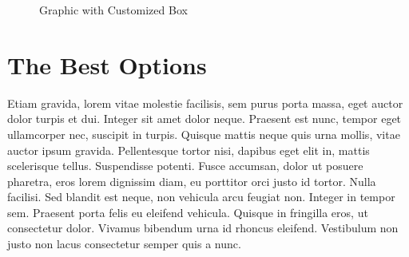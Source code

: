 \begin{figure}
  \centering
  \setlength{\fboxrule}{3pt}
  \setlength{\fboxsep}{1cm}
  \caption{Graphic with Customized Box}
  \label{fig:boxed_custom}
\end{figure}


\section{The Best Options}

Etiam gravida, lorem vitae molestie facilisis, sem purus porta massa, eget auctor dolor turpis et dui. Integer sit amet dolor neque. Praesent est nunc, tempor eget ullamcorper nec, suscipit in turpis. Quisque mattis neque quis urna mollis, vitae auctor ipsum gravida. Pellentesque tortor nisi, dapibus eget elit in, mattis scelerisque tellus. Suspendisse potenti. Fusce accumsan, dolor ut posuere pharetra, eros lorem dignissim diam, eu porttitor orci justo id tortor. Nulla facilisi. Sed blandit est neque, non vehicula arcu feugiat non. Integer in tempor sem. Praesent porta felis eu eleifend vehicula. Quisque in fringilla eros, ut consectetur dolor. Vivamus bibendum urna id rhoncus eleifend. Vestibulum non justo non lacus consectetur semper quis a nunc.

